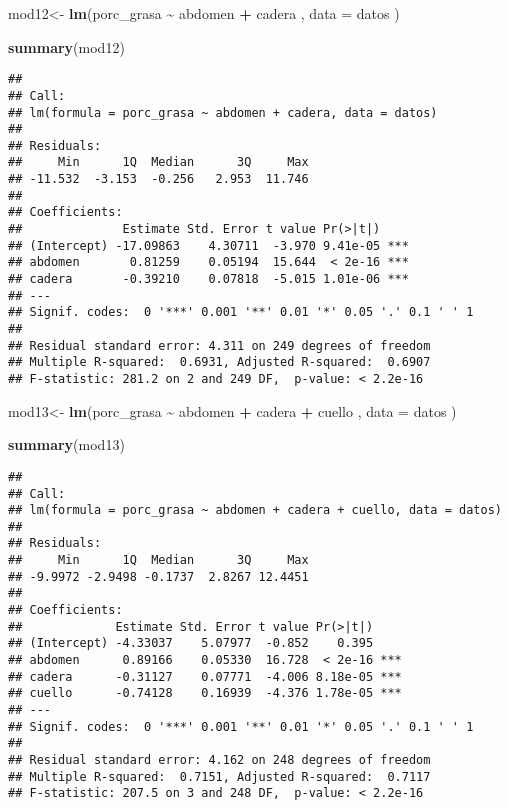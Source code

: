 \documentclass[
]{article}
\newenvironment{Shaded}{\begin{snugshade}}{\end{snugshade}}
\newcommand{\AttributeTok}[1]{\textcolor[rgb]{0.13,0.29,0.53}{#1}}
\newcommand{\FunctionTok}[1]{\textcolor[rgb]{0.13,0.29,0.53}{\textbf{#1}}}
\newcommand{\NormalTok}[1]{#1}
\newcommand{\OtherTok}[1]{\textcolor[rgb]{0.56,0.35,0.01}{#1}}
\newcommand{\SpecialCharTok}[1]{\textcolor[rgb]{0.81,0.36,0.00}{\textbf{#1}}}
\begin{document}
\begin{Shaded}
\begin{Highlighting}[]
\NormalTok{mod12}\OtherTok{\textless{}{-}} \FunctionTok{lm}\NormalTok{(porc\_grasa }\SpecialCharTok{\textasciitilde{}}\NormalTok{  abdomen }\SpecialCharTok{+}\NormalTok{ cadera , }\AttributeTok{data =}\NormalTok{ datos )}

\FunctionTok{summary}\NormalTok{(mod12)}
\end{Highlighting}
\end{Shaded}

\begin{verbatim}
## 
## Call:
## lm(formula = porc_grasa ~ abdomen + cadera, data = datos)
## 
## Residuals:
##     Min      1Q  Median      3Q     Max 
## -11.532  -3.153  -0.256   2.953  11.746 
## 
## Coefficients:
##              Estimate Std. Error t value Pr(>|t|)    
## (Intercept) -17.09863    4.30711  -3.970 9.41e-05 ***
## abdomen       0.81259    0.05194  15.644  < 2e-16 ***
## cadera       -0.39210    0.07818  -5.015 1.01e-06 ***
## ---
## Signif. codes:  0 '***' 0.001 '**' 0.01 '*' 0.05 '.' 0.1 ' ' 1
## 
## Residual standard error: 4.311 on 249 degrees of freedom
## Multiple R-squared:  0.6931, Adjusted R-squared:  0.6907 
## F-statistic: 281.2 on 2 and 249 DF,  p-value: < 2.2e-16
\end{verbatim}

\begin{Shaded}
\begin{Highlighting}[]
\NormalTok{mod13}\OtherTok{\textless{}{-}} \FunctionTok{lm}\NormalTok{(porc\_grasa }\SpecialCharTok{\textasciitilde{}}\NormalTok{  abdomen }\SpecialCharTok{+}\NormalTok{ cadera }\SpecialCharTok{+}\NormalTok{ cuello , }\AttributeTok{data =}\NormalTok{ datos )}

\FunctionTok{summary}\NormalTok{(mod13)}
\end{Highlighting}
\end{Shaded}

\begin{verbatim}
## 
## Call:
## lm(formula = porc_grasa ~ abdomen + cadera + cuello, data = datos)
## 
## Residuals:
##     Min      1Q  Median      3Q     Max 
## -9.9972 -2.9498 -0.1737  2.8267 12.4451 
## 
## Coefficients:
##             Estimate Std. Error t value Pr(>|t|)    
## (Intercept) -4.33037    5.07977  -0.852    0.395    
## abdomen      0.89166    0.05330  16.728  < 2e-16 ***
## cadera      -0.31127    0.07771  -4.006 8.18e-05 ***
## cuello      -0.74128    0.16939  -4.376 1.78e-05 ***
## ---
## Signif. codes:  0 '***' 0.001 '**' 0.01 '*' 0.05 '.' 0.1 ' ' 1
## 
## Residual standard error: 4.162 on 248 degrees of freedom
## Multiple R-squared:  0.7151, Adjusted R-squared:  0.7117 
## F-statistic: 207.5 on 3 and 248 DF,  p-value: < 2.2e-16
\end{verbatim}
\end{document}
